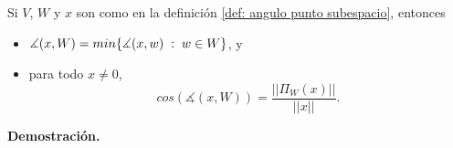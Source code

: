 \begin{prop}
\label{prop: algunos hechos sobre el angulo entre un vector y un subespacio}
Si $V$, $W$ y $x$ son como en la definición 
\ref{def: angulo punto subespacio}, entonces

\begin{itemize}
\item 
$\measuredangle (x, W) = min \{ \measuredangle(x,w) \hspace{0.1cm} :
 \hspace{0.1cm} w \in W \}$, y

\item para todo $x \neq 0$,
\begin{equation}
\label{eq: coseno a subespacio}
cos \left( \measuredangle (x, W) \right) = \frac{|| \Pi_{W}(x) ||}{||x||}.
\end{equation}
\end{itemize}


\end{prop}
\noindent
\textbf{Demostración.}

